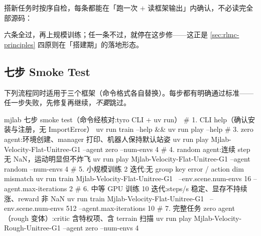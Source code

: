 \begin{insight}\label{ins:rlmc-firstwire}
搭新任务时按序自检，每条都能在「跑一次 $+$ 读框架输出」内确认，不必读完全部源码：
六条全过，再上规模训练；任一条不过，就停在这步修——这正是 \cref{sec:rlmc-principles} 四原则在「搭建期」的落地形态。
\end{insight}

\subsection{七步 Smoke Test}
\label{sec:rlmc-smoke}

下列流程同时适用于三个框架（命令格式各自替换）。每步都有明确通过标准——任一步失败，先修复再继续，\emph{不要}跳过。

\begin{codebox}[bash]{mjlab 七步 smoke test（命令经核对:tyro CLI + uv run）}
# 1. CLI help（确认安装与注册，无 ImportError）
uv run train --help && uv run play --help
# 3. zero agent:环境创建、manager 打印、机器人保持默认站姿
uv run play Mjlab-Velocity-Flat-Unitree-G1 --agent zero --num-envs 4
# 4. random agent:连续 step 无 NaN，运动明显但不炸飞
uv run play Mjlab-Velocity-Flat-Unitree-G1 --agent random --num-envs 4
# 5. 小规模训练 2 迭代:无 group key error / action dim mismatch
uv run train Mjlab-Velocity-Flat-Unitree-G1 \
  --env.scene.num-envs 16 --agent.max-iterations 2
# 6. 中等 GPU 训练 10 迭代:steps/s 稳定、显存不持续涨、reward 非 NaN
uv run train Mjlab-Velocity-Flat-Unitree-G1 \
  --env.scene.num-envs 512 --agent.max-iterations 10
# 7. 完整任务 zero agent（rough 变体）:critic 含特权项、含 terrain 扫描
uv run play Mjlab-Velocity-Rough-Unitree-G1 --agent zero --num-envs 4
\end{codebox}

